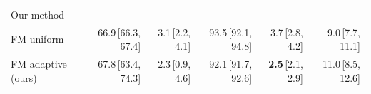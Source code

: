 \begin{tabular}{lrrrrr}
\multicolumn{6}{l}{\footnotesize\color{black!55} Our method} \\
FM uniform & 66.9\,{\scriptsize\color{black!55}[66.3, 67.4]} & 3.1\,{\scriptsize\color{black!55}[2.2, 4.1]} & 93.5\,{\scriptsize\color{black!55}[92.1, 94.8]} & 3.7\,{\scriptsize\color{black!55}[2.8, 4.2]} & 9.0\,{\scriptsize\color{black!55}[7.7, 11.1]} \\
FM adaptive (ours) & 67.8\,{\scriptsize\color{black!55}[63.4, 74.3]} & 2.3\,{\scriptsize\color{black!55}[0.9, 4.6]} & 92.1\,{\scriptsize\color{black!55}[91.7, 92.6]} & \textbf{2.5}\,{\scriptsize\color{black!55}[2.1, 2.9]} & 11.0\,{\scriptsize\color{black!55}[8.5, 12.6]} \\
\bottomrule
\end{tabular}
